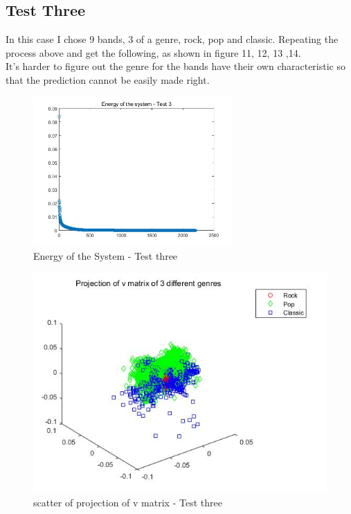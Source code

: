 \documentclass[12pt,letterpaper]{article}
\begin{document}
\subsection{Test Three}
In this case I chose 9 bands, 3 of a genre, rock, pop and classic.
Repeating the process above and get the following, as shown in figure 11, 12, 13 ,14.\\
It's harder to figure out the genre for the bands have their own characteristic so that the prediction cannot be easily made right.
\begin{figure}[h]
	\centering
	\includegraphics[width=3.0in]{p12}
	\caption{Energy of the System - Test three}
\end{figure}

\begin{figure}[h]
	\centering
	\includegraphics[width=5.0in]{p13}
	\caption{scatter of projection of v matrix - Test three}
\end{figure}
\end{document}
